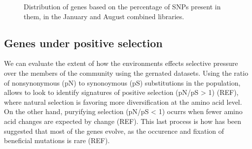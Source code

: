 \begin{figure}[h]
\centering
{}
    \hfill
{}
    \caption{Distribution of genes based on the percentage of SNPs present in them, in the January and August combined libraries.}
    \label{SNPs_Boxplot}
\end{figure}


\clearpage
\subsection{Genes under positive selection}

We can evaluate the extent of how the environments effects selective pressure over the  members of the community using the gernated datasets. Using the ratio of nonsynonymous (pN) to synonoymous (pS) substitutions in the population, allows to look to identify signatures of positive selection (pN/pS > 1) (REF), where natural selection is favoring more diversification at the amino acid level. On the other hand, puryifying selection (pN/pS < 1) ocurrs when fewer amino acid changes are expected by change (REF). This last process is how has been suggested that most of the genes evolve, as the occurence and fixation of beneficial mutations is rare (REF).


